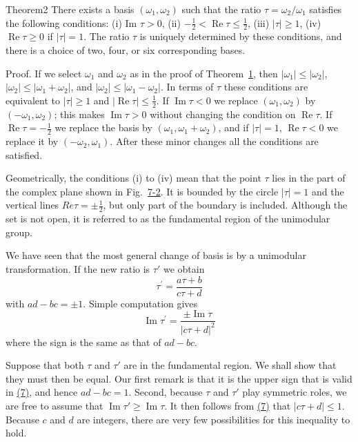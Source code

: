 \begin{originalstatement}{Theorem}{2}\label{thm:7.2}
There exists a basis $(\omega_{1},\omega_{2})$ such that the ratio $\tau = \omega_{2} / \omega_{1}$ satisfies the following conditions: (i) Im $\tau >0$, (ii) $-\frac{1}{2} < \operatorname{Re}\tau \leq \frac{1}{2}$, (iii) $|\tau |\geq 1$, (iv) $\operatorname{Re}\tau \geq 0$ if $|\tau | = 1$. The ratio $\tau$ is uniquely determined by these conditions, and there is a choice of two, four, or six corresponding bases.
\end{originalstatement}
Proof. If we select $\omega_{1}$ and $\omega_{2}$ as in the proof of Theorem~\hyperref[thm:7.1]{1}, then $|\omega_{1}| \leq |\omega_{2}|$, $|\omega_{2}| \leq |\omega_{1} + \omega_{2}|$, and $|\omega_{2}| \leq |\omega_{1} - \omega_{2}|$. In terms of $\tau$ these conditions are equivalent to $|\tau| \geq 1$ and $|\operatorname{Re} \tau| \leq \frac{1}{2}$. If $\operatorname{Im} \tau < 0$ we replace $(\omega_{1}, \omega_{2})$ by $(- \omega_{1}, \omega_{2})$; this makes $\operatorname{Im} \tau > 0$ without changing the condition on $\operatorname{Re} \tau$. If $\operatorname{Re} \tau = -\frac{1}{2}$ we replace the basis by $(\omega_{1}, \omega_{1} + \omega_{2})$, and if $|\tau| = 1$, $\operatorname{Re} \tau < 0$ we replace it by $(- \omega_{2}, \omega_{1})$. After these minor changes all the conditions are satisfied.

Geometrically, the conditions (i) to (iv) mean that the point $\tau$ lies in the part of the complex plane shown in Fig.~\hyperref[fig:7-2]{7-2}. It is bounded by the circle $|\tau| = 1$ and the vertical lines $Re\tau = \pm\frac{1}{2}$, but only part of the
boundary is included. Although the set is not open, it is referred to as the fundamental region of the unimodular group.

We have seen that the most general change of basis is by a unimodular transformation. If the new ratio is $\tau'$ we obtain
\begin{equation*}
\tau^ {\prime} = \frac {a \tau + b}{c \tau + d}\tag{6}\label{eq:7.6}
\end{equation*}
with $ad - bc = \pm 1$. Simple computation gives
\begin{equation*}
\operatorname{Im} \tau^ {\prime} = \frac {\pm \operatorname{Im} \tau}{| c \tau + d | ^ {2}}\tag{7}\label{eq:7.7}
\end{equation*}
where the sign is the same as that of $ad - bc$.

Suppose that both $\tau$ and $\tau'$ are in the fundamental region. We shall show that they must then be equal. Our first remark is that it is the upper sign that is valid in \hyperref[eq:7.7]{(7)}, and hence $ad - bc = 1$. Second, because $\tau$ and $\tau'$ play symmetric roles, we are free to assume that $\operatorname{Im} \tau' \geq \operatorname{Im} \tau$. It then follows from \hyperref[eq:7.7]{(7)} that $|c\tau + d| \leq 1$. Because $c$ and $d$ are integers, there are very few possibilities for this inequality to hold.

